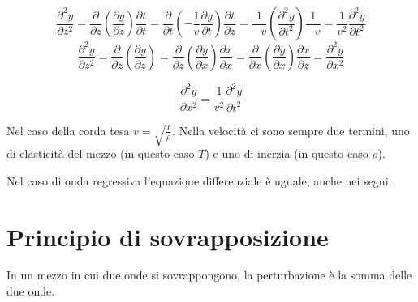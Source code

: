 \[\frac{\partial^2 y}{\partial z^2}=\frac{\partial}{\partial z}\left(\frac{\partial y}{\partial z}\right)\frac{\partial t}{\partial t}=\frac{\partial}{\partial t}\left(-\frac{1}{v}\frac{\partial y}{\partial t}\right)\frac{\partial t}{\partial z}=\frac{1}{-v}\left(\frac{\partial^2 y}{\partial t^2}\right)\frac{1}{-v}=\frac{1}{v^2}\frac{\partial^2 y}{\partial t^2}\]
\[\frac{\partial^2 y}{\partial z^2}=\frac{\partial}{\partial z}\left(\frac{\partial y}{\partial z}\right)=\frac{\partial}{\partial z}\left(\frac{\partial y}{\partial x}\right)\frac{\partial x}{\partial x}=\frac{\partial}{\partial x}\left(\frac{\partial y}{\partial x}\right)\frac{\partial x}{\partial z}=\frac{\partial^2 y}{\partial x^2}\]

\begin{equation}
   \frac{\partial^2 y}{\partial x^2}=\frac{1}{v^2}\frac{\partial^2 y}{\partial t^2}
\end{equation}

Nel caso della corda tesa $v=\sqrt{\frac{T}{\rho}}$. Nella velocità ci sono sempre due termini, uno di elasticità del mezzo (in questo caso $T$) e uno di inerzia (in questo caso $\rho$).

Nel caso di onda regressiva l'equazione differenziale è uguale, anche nei segni.
\section{Principio di sovrapposizione}
\begin{Pri}[sovrapposizione]
   In un mezzo in cui due onde si sovrappongono, la perturbazione è la somma delle due onde.
\end{Pri}
